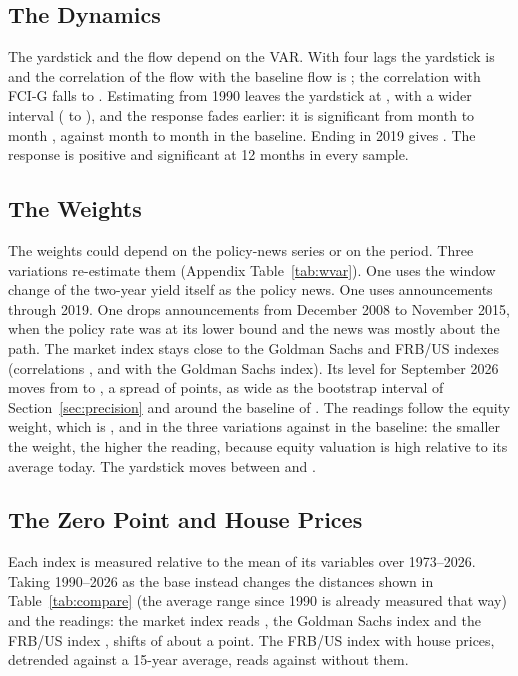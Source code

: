 \documentclass[11pt]{article}
\begin{document}
\subsection{The Dynamics}\label{sec:robvar}
The yardstick and the flow depend on the VAR. With four lags the yardstick is  and the correlation of the flow with the baseline flow is ; the correlation with FCI-G falls to . Estimating from 1990 leaves the yardstick at , with a wider interval ( to ), and the response fades earlier: it is significant from month  to month , against month  to month  in the baseline. Ending in 2019 gives . The response is positive and significant at 12 months in every sample.

\subsection{The Weights}\label{sec:robweights}
The weights could depend on the policy-news series or on the period. Three variations re-estimate them (Appendix Table~\ref{tab:wvar}). One uses the window change of the two-year yield itself as the policy news. One uses announcements through 2019. One drops announcements from December 2008 to November 2015, when the policy rate was at its lower bound and the news was mostly about the path. The market index stays close to the Goldman Sachs and FRB/US indexes (correlations ,  and  with the Goldman Sachs index). Its level for September 2026 moves from  to , a spread of  points, as wide as the bootstrap interval of Section~\ref{sec:precision} and around the baseline of . The readings follow the equity weight, which is ,  and  in the three variations against  in the baseline: the smaller the weight, the higher the reading, because equity valuation is high relative to its average today. The yardstick moves between  and .

\subsection{The Zero Point and House Prices}\label{sec:robzero}
Each index is measured relative to the mean of its variables over 1973--2026. Taking 1990--2026 as the base instead changes the distances shown in Table~\ref{tab:compare} (the average range since 1990 is already measured that way) and the readings: the market index reads , the Goldman Sachs index  and the FRB/US index , shifts of about a point. The FRB/US index with house prices, detrended against a 15-year average, reads  against  without them.
\end{document}
